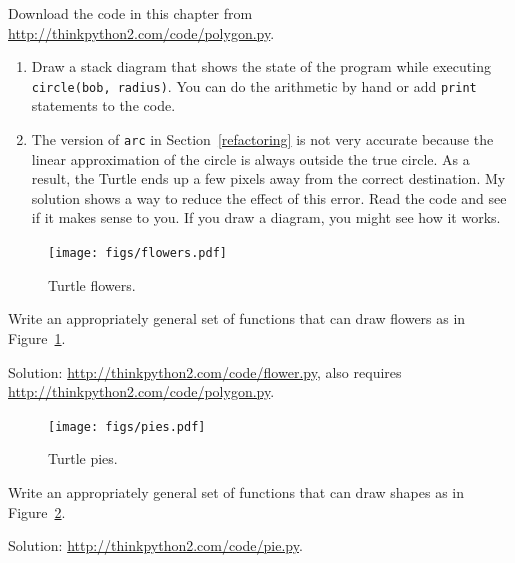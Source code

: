 \documentclass[10pt]{book}
\begin{document}
\begin{exercise}

Download the code in this chapter from
\url{http://thinkpython2.com/code/polygon.py}.

\begin{enumerate}

\item Draw a stack diagram that shows the state of the program
while executing {\tt circle(bob, radius)}.  You can do the
arithmetic by hand or add {\tt print} statements to the code.

\item The version of {\tt arc} in Section~\ref{refactoring} is not
very accurate because the linear approximation of the
circle is always outside the true circle.  As a result,
the Turtle ends up a few pixels away from the correct
destination.  My solution shows a way to reduce
the effect of this error.  Read the code and see if it makes
sense to you.  If you draw a diagram, you might see how it works.

\end{enumerate}

\end{exercise}

\begin{figure}
\centerline
{\texttt{[image: figs/flowers.pdf]}}
\caption{Turtle flowers.}
\label{fig.flowers}
\end{figure}

\begin{exercise}

Write an appropriately general set of functions that
can draw flowers as in Figure~\ref{fig.flowers}.

Solution: \url{http://thinkpython2.com/code/flower.py},
also requires \url{http://thinkpython2.com/code/polygon.py}.

\end{exercise}

\begin{figure}
\centerline
{\texttt{[image: figs/pies.pdf]}}
\caption{Turtle pies.}
\label{fig.pies}
\end{figure}


\begin{exercise}

Write an appropriately general set of functions that
can draw shapes as in Figure~\ref{fig.pies}.

Solution: \url{http://thinkpython2.com/code/pie.py}.

\end{exercise}
\end{document}
